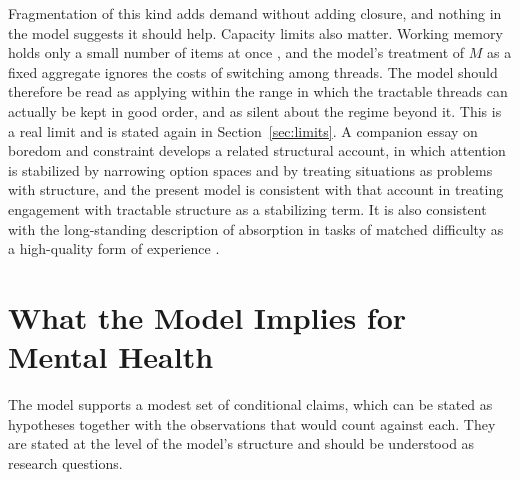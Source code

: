 \documentclass[11pt]{article}
\theoremstyle{definition}
\begin{document}
Fragmentation of this kind adds demand without adding closure, and nothing in the model suggests it should help. Capacity limits also matter. Working memory holds only a small number of items at once \cite{cowan2001}, and the model's treatment of $M$ as a fixed aggregate ignores the costs of switching among threads. The model should therefore be read as applying within the range in which the tractable threads can actually be kept in good order, and as silent about the regime beyond it. This is a real limit and is stated again in Section~\ref{sec:limits}. A companion essay on boredom and constraint develops a related structural account, in which attention is stabilized by narrowing option spaces and by treating situations as problems with structure, and the present model is consistent with that account in treating engagement with tractable structure as a stabilizing term. It is also consistent with the long-standing description of absorption in tasks of matched difficulty as a high-quality form of experience \cite{csikszentmihalyi1990}.

\section{What the Model Implies for Mental Health}
\label{sec:application}

The model supports a modest set of conditional claims, which can be stated as hypotheses together with the observations that would count against each. They are stated at the level of the model's structure and should be understood as research questions.
\end{document}

